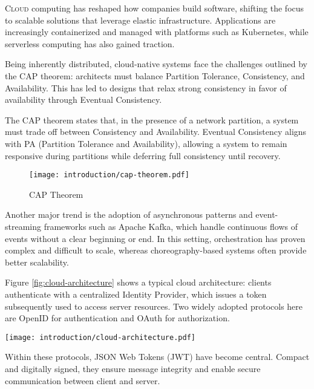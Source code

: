 \lettrine{C}{loud} computing has reshaped how companies build software, shifting the focus to scalable solutions that leverage elastic infrastructure. 
Applications are increasingly containerized and managed with platforms such as Kubernetes, while serverless computing has also gained traction.  

\vspace{0.5em} Being inherently distributed, cloud-native systems face the challenges outlined by the CAP theorem: architects must balance Partition Tolerance, Consistency, and Availability. 
This has led to designs that relax strong consistency in favor of availability through Eventual Consistency.  

\begin{boxF}
    The CAP theorem \cite{c1} states that, in the presence of a network partition, a system must trade off between Consistency and Availability. 
    Eventual Consistency aligns with PA (Partition Tolerance and Availability), allowing a system to remain responsive during partitions while deferring full consistency until recovery. 
\end{boxF}

\begin{figure}[h]
    \centering
    \texttt{[image: introduction/cap-theorem.pdf]}
    \caption{CAP Theorem}
    \label{fig:cap-theorem}
\end{figure}

Another major trend is the adoption of asynchronous patterns and event-streaming frameworks such as Apache Kafka, which handle continuous flows of events without a clear beginning or end.  
In this setting, orchestration has proven complex and difficult to scale, whereas choreography-based systems often provide better scalability.  

Figure \ref{fig:cloud-architecture} shows a typical cloud architecture: clients authenticate with a centralized Identity Provider, which issues a token subsequently used to access server resources. 
Two widely adopted protocols here are OpenID \cite{c4} for authentication and OAuth \cite{c5} for authorization.  

\begin{figure*}[htbp]
    \centering
    \texttt{[image: introduction/cloud-architecture.pdf]}
    \caption{Cloud Architecture}
    \label{fig:cloud-architecture}
\end{figure*}

\vspace{0.5em} Within these protocols, JSON Web Tokens (JWT) \cite{c6} have become central. 
Compact and digitally signed, they ensure message integrity and enable secure communication between client and server.  

